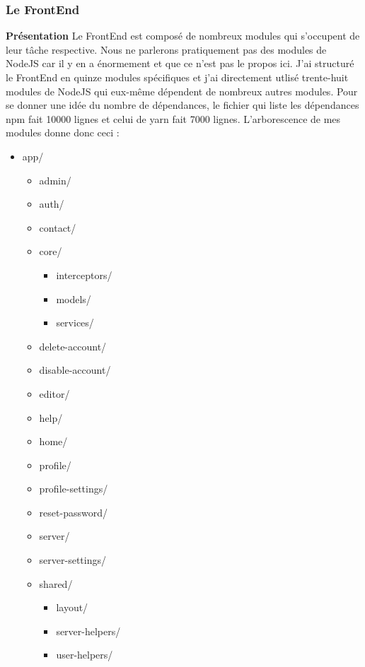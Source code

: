 \documentclass{article}
\begin{document}
\subsubsection{Le FrontEnd}
\textbf{Présentation}
\newline
\newline
Le FrontEnd est composé de nombreux modules qui s'occupent de leur tâche respective. Nous ne parlerons pratiquement pas des modules de NodeJS car il y en a énormement et que ce n'est pas le propos ici.
\newline
J'ai structuré le FrontEnd en quinze modules spécifiques et j'ai directement utlisé trente-huit modules de NodeJS qui eux-même dépendent de nombreux autres modules.
\newline
Pour se donner une idée du nombre de dépendances, le fichier qui liste les dépendances npm fait 10000 lignes et celui de yarn fait 7000 lignes.
\newline
L'arborescence de mes modules donne donc ceci :
\begin{itemize}
	\item[] app/
	\begin{itemize}
		\item[]admin/
		\item[]auth/
		\item[]contact/
		\item[]core/
		\begin{itemize}
			\item[]interceptors/
			\item[]models/
			\item[]services/
		\end{itemize}
		\item[]delete-account/
		\item[]disable-account/
		\item[]editor/
		\item[]help/
		\item[]home/
		\item[]profile/
		\item[]profile-settings/
		\item[]reset-password/
		\item[]server/
		\item[]server-settings/
		\item[]shared/
		\begin{itemize}
			\item[]layout/
			\item[]server-helpers/
			\item[]user-helpers/
		\end{itemize}
	\end{itemize}
\end{itemize}
\end{document}
